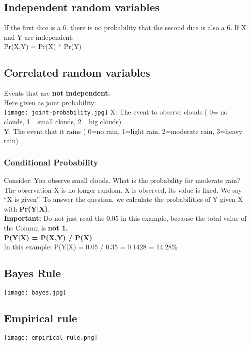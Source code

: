\subsection{Independent random variables}
If the first dice is a 6, there is no probability that the second dice is also a 6.
If X and Y are independent:\\
Pr(X,Y) = Pr(X) * Pr(Y)

\subsection{Correlated random variables}
Events that are \textbf{not independent.}\\
Here given as joint probability:\\
\texttt{[image: joint-probability.jpg]}
X: The event to observe clouds ( 0= no clouds, 1= small clouds, 2= big clouds)\\
Y: The event that it rains ( 0=no rain, 1=light rain, 2=moderate rain, 3=heavy rain)

\subsubsection{Conditional Probability}
Consider: You observe small clouds. What is the probability for moderate rain?
The observation X is no longer random. X is observed, its value is fixed. We say ``X is given''.
To answer the question, we calculate the probabilities of Y given X with \textbf{Pr(Y|X)}.\\
\textbf{Important:} Do not just read the 0.05 in this example, because the total value of the Column is \textbf{not 1.}\\
\textbf{P(Y|X) = P(X,Y) / P(X)}\\
In this example: P(Y|X) = 0.05 / 0.35 = 0.1428 = 14.28\%

\subsection{Bayes Rule}
\texttt{[image: bayes.jpg]}

\subsection{Empirical rule}
\texttt{[image: empirical-rule.png]}